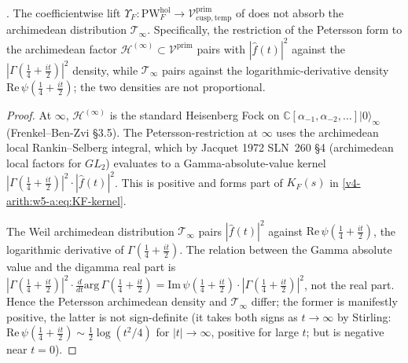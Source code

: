 \begin{proposition}
\label{v4-arith:w5-a:prop:archimedean-not-absorbed}
\ClaimStatusProvedHere. The coefficientwise lift
\(\Upsilon_{F}\colon\mathrm{PW}^{\mathrm{hol}}_{F}\to\mathcal{V}^{\mathrm{prim}}_{\mathrm{cusp,temp}}\)
of  does not absorb the archimedean
distribution \(\mathcal{T}_{\infty}\). Specifically, the restriction of
the Petersson form to the archimedean factor
\(\mathcal{H}^{(\infty)}\subset\mathcal{V}^{\mathrm{prim}}\) pairs with
\(|\widehat{f}(t)|^{2}\) against the \emph{\(|\Gamma(\tfrac{1}{4}+\tfrac{it}{2})|^{2}\)}
density, while \(\mathcal{T}_{\infty}\) pairs against the
logarithmic-derivative density \(\mathrm{Re}\,\psi(\tfrac{1}{4}+\tfrac{it}{2})\);
the two densities are not proportional.
\end{proposition}

\begin{proof}
At \(\infty\), \(\mathcal{H}^{(\infty)}\) is the standard Heisenberg Fock
on \(\mathbb{C}[\alpha_{-1},\alpha_{-2},\ldots]|0\rangle_{\infty}\)
(Frenkel--Ben-Zvi \S3.5). The Petersson-restriction at \(\infty\) uses
the archimedean local Rankin--Selberg integral, which by
Jacquet 1972 SLN~260 \S4 (archimedean local factors for \(GL_{2}\))
evaluates to a Gamma-absolute-value kernel
\(|\Gamma(\tfrac{1}{4}+\tfrac{it}{2})|^{2}\cdot|\widehat{f}(t)|^{2}\).
This is positive and forms part of \(K_{F}(s)\) in
\eqref{v4-arith:w5-a:eq:KF-kernel}.

The Weil archimedean distribution \(\mathcal{T}_{\infty}\) pairs
\(|\widehat{f}(t)|^{2}\) against
\(\mathrm{Re}\,\psi(\tfrac{1}{4}+\tfrac{it}{2})\), the logarithmic
derivative of \(\Gamma(\tfrac{1}{4}+\tfrac{it}{2})\). The relation
between the Gamma absolute value and the digamma real part is
\(|\Gamma(\tfrac{1}{4}+\tfrac{it}{2})|^{2}\cdot\frac{d}{dt}\mathrm{arg}\,\Gamma(\tfrac{1}{4}+\tfrac{it}{2})=\mathrm{Im}\,\psi(\tfrac{1}{4}+\tfrac{it}{2})\cdot|\Gamma(\tfrac{1}{4}+\tfrac{it}{2})|^{2}\),
not the real part. Hence the Petersson archimedean density and
\(\mathcal{T}_{\infty}\) differ; the former is manifestly positive, the
latter is not sign-definite (it takes both signs as \(t\to\infty\) by
Stirling: \(\mathrm{Re}\,\psi(\tfrac{1}{4}+\tfrac{it}{2})\sim\frac{1}{2}\log(t^{2}/4)\)
for \(|t|\to\infty\), positive for large \(t\); but is negative near
\(t=0\)).
\end{proof}

